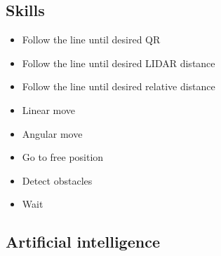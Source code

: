     \subsection{Skills} %
    \label{sub:skills}
    
    \begin{itemize}
        \item Follow the line until desired QR
        \item Follow the line until desired LIDAR distance
        \item Follow the line until desired relative distance
        \item Linear move
        \item Angular move
        \item Go to free position
        \item Detect obstacles
        \item Wait
    \end{itemize}


    \subsection{Artificial intelligence} %
    \label{sub:mr_artificial_intelligence}
    

